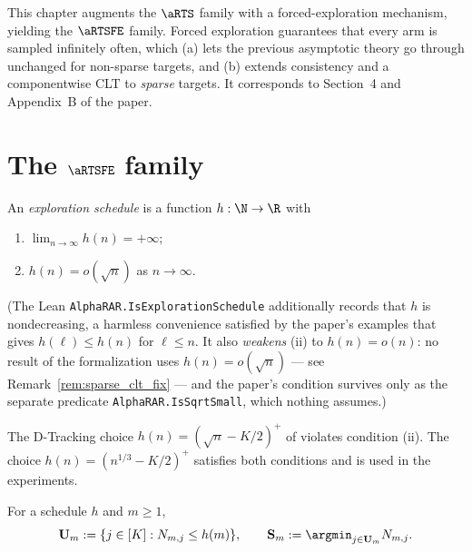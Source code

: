 This chapter augments the $\aRTS$ family with a forced-exploration mechanism,
yielding the $\aRTSFE$ family. Forced exploration guarantees that every arm is
sampled infinitely often, which (a) lets the previous asymptotic theory go
through unchanged for non-sparse targets, and (b) extends consistency and a
componentwise CLT to \emph{sparse} targets. It corresponds to Section~4 and
Appendix~B of the paper.

\section{The \texorpdfstring{$\aRTSFE$}{aRTS-FE} family}
\label{sec:forced_def}

\begin{definition}\label{def:exploration_schedule}
\leanok
An \emph{exploration schedule} is a function $h : \N \to \R$ with
\begin{enumerate}
  \item[(i)] $\lim_{n\to\infty} h(n) = +\infty$;
  \item[(ii)] $h(n) = o(\sqrt n)$ as $n\to\infty$.
\end{enumerate}
(The Lean \texttt{AlphaRAR.IsExplorationSchedule} additionally records that $h$ is nondecreasing, a
harmless convenience satisfied by the paper's examples that gives $h(\ell)\le h(n)$ for $\ell\le n$.
It also \emph{weakens} (ii) to $h(n)=o(n)$: no result of the formalization uses $h(n)=o(\sqrt n)$
--- see Remark~\ref{rem:sparse_clt_fix} --- and the paper's condition survives only as the separate
predicate \texttt{AlphaRAR.IsSqrtSmall}, which nothing assumes.)
\end{definition}

\begin{example}\label{ex:h_choice}
The D-Tracking choice $h(n) = (\sqrt n - K/2)^+$ of \cite{garivier2016optimal}
violates condition (ii). The choice $h(n) = (n^{1/3} - K/2)^+$ satisfies both
conditions and is used in the experiments.
\end{example}

\begin{definition}\label{def:underexplored_sets}
For a schedule $h$ and $m\ge1$,
\[
  \mathbf{U}_m := \{ j\in[K] : N_{m,j} \le h(m)\}, \qquad
  \mathbf{S}_m := \argmin_{j\in\mathbf{U}_m} N_{m,j}.
\]
\end{definition}

